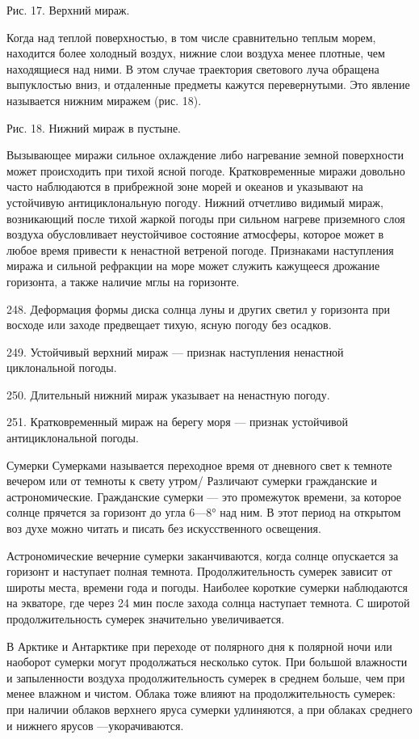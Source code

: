 Рис. 17. Верхний мираж.

Когда над теплой поверхностью, в том числе сравнительно теплым морем, находится более холодный воздух, нижние слои воздуха менее плотные, чем находящиеся над ними. В этом случае траектория светового луча обращена выпуклостью вниз, и отдаленные предметы кажутся перевернутыми. Это явление называется нижним миражем (рис. 18).


Рис. 18. Нижний мираж в пустыне.

Вызывающее миражи сильное охлаждение либо нагревание земной поверхности может происходить при тихой ясной погоде. Кратковременные миражи довольно часто наблюдаются в прибрежной зоне морей и океанов и указывают на устойчивую антициклональную погоду. Нижний отчетливо видимый мираж, возникающий после тихой жаркой погоды при сильном нагреве приземного слоя воздуха обусловливает неустойчивое состояние атмосферы, которое может в любое время привести к ненастной ветреной погоде. Признаками наступления миража и сильной рефракции на море может служить кажущееся дрожание горизонта, а также наличие мглы на горизонте.

248. Деформация формы диска солнца луны и других светил у горизонта при восходе или заходе предвещает тихую, ясную погоду без осадков.

249. Устойчивый верхний мираж — признак наступления ненастной циклональной погоды.

250. Длительный нижний мираж указывает на ненастную погоду.

251. Кратковременный мираж на берегу моря — признак устойчивой антициклональной погоды.

Сумерки
Сумерками называется переходное время от дневного свет к темноте вечером или от темноты к свету утром/ Различают сумерки гражданские и астрономические. Гражданские сумерки — это промежуток времени, за которое солнце прячется за горизонт до угла 6—8° над ним. В этот период на открытом воз духе можно читать и писать без искусственного освещения.

Астрономические вечерние сумерки заканчиваются, когда солнце опускается за горизонт и наступает полная темнота. Продолжительность сумерек зависит от широты места, времени года и погоды. Наиболее короткие сумерки наблюдаются на экваторе, где через 24 мин после захода солнца наступает темнота. С широтой продолжительность сумерек значительно увеличивается.

В Арктике и Антарктике при переходе от полярного дня к полярной ночи или наоборот сумерки могут продолжаться несколько суток. При большой влажности и запыленности воздуха продолжительность сумерек в среднем больше, чем при менее влажном и чистом. Облака тоже влияют на продолжительность сумерек: при наличии облаков верхнего яруса сумерки удлиняются, а при облаках среднего и нижнего ярусов —укорачиваются.

